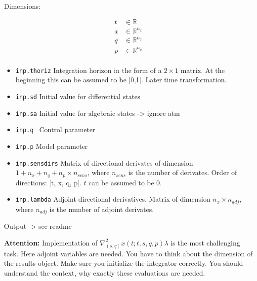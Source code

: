 \documentclass[12pt]{article}
\begin{document}
\begin{align}
  
\end{align}

Dimensions:

\begin{align}
  t &\in \mathbb{R}                \\
  x &\in \mathbb{R}^{n_x}         \\
  q &\in \mathbb{R}^{n_q}         \\
  p &\in \mathbb{R}^{n_p}         \\
\end{align}

\begin{itemize}
    \item \texttt{inp.thoriz} Integration horizon in the form of a $2 \times 1$ matrix. At the beginning  this can be assumed to be [0,1]. Later time transformation.
    \item \texttt{inp.sd} Initial value for differential states 
    \item \texttt{inp.sa} Initial value for algebraic states -> ignore atm
    \item \texttt{inp.q } Control parameter
    \item \texttt{inp.p} Model parameter
    \item \texttt{inp.sensdirs} Matrix of directional derivates of dimension $1+n_x+n_q+n_p \times n_{sens}$, where $n_{sens}$ is the number of derivates.
         Order of directions: [t, x, q, p]. $t$ can be assumed to be 0.
    \item \texttt{inp.lambda} Adjoint directional derivatives. 
           Matrix of dimension $n_x \times n_{adj}$, where $n_{adj}$ is the number of adjoint derivates.
\end{itemize}


Output -> see readme


\textbf{Attention:} Implementation of $\nabla^2_{(s,q)} x(t;t,s,q,p) \lambda$ is the most challenging task. 
Here adjoint variables are needed. 
You have to think about the dimension of the results object. Make sure you initialize the integrator correctly. 
You should understand the context, why exactly these evaluations are needed.
\end{document}
